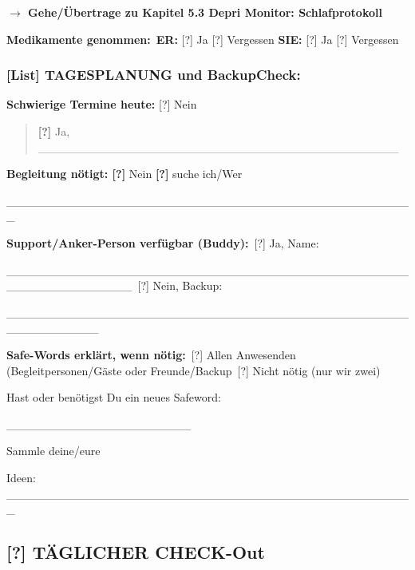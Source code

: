 \textbf{$\rightarrow$ Gehe/Übertrage zu Kapitel 5.3 Depri Monitor: Schlafprotokoll}

\textbf{Medikamente genommen:}\
\textbf{ER:} [?] Ja [?] Vergessen \textbf{SIE:} [?] Ja [?] Vergessen

\hypertarget{section-1}{%
\subsubsection{}\label{section-1}}

\hypertarget{tagesplanung-und-backupcheck}{%
\subsubsection{\texorpdfstring{\textbf{[List] TAGESPLANUNG und BackupCheck:}}{[List] TAGESPLANUNG und BackupCheck:}}\label{tagesplanung-und-backupcheck}}

\textbf{Schwierige Termine heute:} [?] Nein

\begin{quote}
\textbf{[?]} Ja, \_\_\_\_\_\_\_\_\_\_\_\_\_\_\_\_\_\_\_\_\_\_\_\_\_\_\_\_\_\_\_\_\_\_\_\_\_\_\_\_\_\_\_
\end{quote}

\textbf{Begleitung nötigt: [?]} Nein \textbf{[?]} suche ich/Wer

\_\_\_\_\_\_\_\_\_\_\_\_\_\_\_\_\_\_\_\_\_\_\_\_\_\_\_\_\_\_\_\_\_\_\_\_\_\_\_\_\_\_\_\_\_\_\_\_\_

\textbf{Support/Anker-Person verfügbar (Buddy):}\
[?] Ja, Name:

\_\_\_\_\_\_\_\_\_\_\_\_\_\_\_\_\_\_\_\_\_\_\_\_\_\_\_\_\_\_\_\_\_\_\_\_\_\_\_\_\_\_\_\_\_\_\_\_\_\_\_\_\_\_\_\_\_\_\_\_\_\_\_\
[?] Nein, Backup:

\_\_\_\_\_\_\_\_\_\_\_\_\_\_\_\_\_\_\_\_\_\_\_\_\_\_\_\_\_\_\_\_\_\_\_\_\_\_\_\_\_\_\_\_\_\_\_\_\_\_\_\_\_\_\_\_\_\_\_

\textbf{Safe-Words erklärt, wenn nötig:}\
[?] Allen Anwesenden (Begleitpersonen/Gäste oder Freunde/Backup\
[?] Nicht nötig (nur wir zwei)

Hast oder benötigst Du ein neues Safeword:

\_\_\_\_\_\_\_\_\_\_\_\_\_\_\_\_\_\_\_\_\_\_

Sammle deine/eure

Ideen: \_\_\_\_\_\_\_\_\_\_\_\_\_\_\_\_\_\_\_\_\_\_\_\_\_\_\_\_\_\_\_\_\_\_\_\_\_\_\_\_\_\_\_\_\_\_\_\_\_

\hypertarget{tuxe4glicher-check-out}{%
\subsection{\texorpdfstring{[?] \textbf{TÄGLICHER CHECK-Out}}{[?] TÄGLICHER CHECK-Out}}\label{tuxe4glicher-check-out}}


